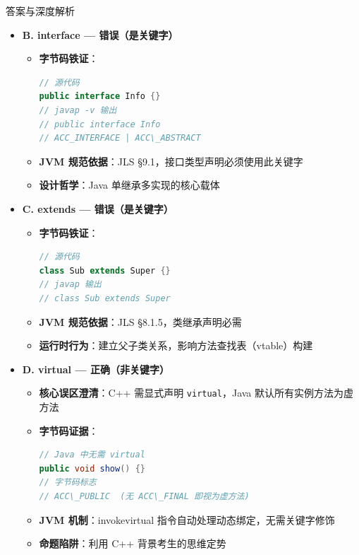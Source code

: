 ﻿\documentclass[12pt, a4paper]{ctexart}
\newcommand{\code}[1]{\texttt{#1}}
\begin{document}
\begin{enumerate}[label=\textbf{\arabic*.}, itemsep=1em]
\begin{bluebox}{答案与深度解析}
\begin{itemize}[leftmargin=*, nosep]
			      \item \textbf{B. interface — 错误（是关键字）}
			            \begin{itemize}[leftmargin=*, nosep]
				            \item \textbf{字节码铁证}：
				                  \begin{lstlisting}[language=Java]
// 源代码
public interface Info {}
// javap -v 输出
// public interface Info
// ACC_INTERFACE | ACC\_ABSTRACT
            \end{lstlisting}
				            \item \textbf{JVM 规范依据}：JLS §9.1，接口类型声明必须使用此关键字
				            \item \textbf{设计哲学}：Java 单继承多实现的核心载体
			            \end{itemize}

			      \item \textbf{C. extends — 错误（是关键字）}
			            \begin{itemize}[leftmargin=*, nosep]
				            \item \textbf{字节码铁证}：
				                  \begin{lstlisting}[language=Java]
// 源代码
class Sub extends Super {}
// javap 输出
// class Sub extends Super
            \end{lstlisting}
				            \item \textbf{JVM 规范依据}：JLS §8.1.5，类继承声明必需
				            \item \textbf{运行时行为}：建立父子类关系，影响方法查找表（vtable）构建
			            \end{itemize}

			      \item \textbf{D. virtual — 正确（非关键字）}
			            \begin{itemize}[leftmargin=*, nosep]
				            \item \textbf{核心误区澄清}：C++ 需显式声明 \code{virtual}，Java 默认所有实例方法为虚方法
				            \item \textbf{字节码证据}：
				                  \begin{lstlisting}[language=Java]
// Java 中无需 virtual
public void show() {} 
// 字节码标志
// ACC\_PUBLIC  (无 ACC\_FINAL 即视为虚方法)
            \end{lstlisting}
				            \item \textbf{JVM 机制}：invokevirtual 指令自动处理动态绑定，无需关键字修饰
				            \item \textbf{命题陷阱}：利用 C++ 背景考生的思维定势
			            \end{itemize}
		      \end{itemize}


\end{bluebox}
\end{enumerate}
\end{document}
